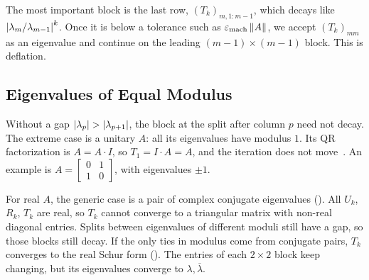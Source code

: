 The most important block is the last row, $(T_k)_{m,1:m-1}$, which decays like $\left\lvert \lambda_m/\lambda_{m-1} \right\rvert^k$. Once it is below a tolerance such as $\varepsilon_{\mathrm{mach}}\left\lVert A \right\rVert$, we accept $(T_k)_{mm}$ as an eigenvalue and continue on the leading $(m-1) \times (m-1)$ block. This is deflation.

\subsection{Eigenvalues of Equal Modulus}

Without a gap $\left\lvert \lambda_p \right\rvert > \left\lvert \lambda_{p+1} \right\rvert$, the block at the split after column $p$ need not decay. The extreme case is a unitary $A$: all its eigenvalues have modulus $1$. Its QR factorization is $A = A \cdot I$, so $T_1 = I \cdot A = A$, and the iteration does not move~\cite[Example~4.6]{Demmel}. An example is $A = \left[\begin{smallmatrix} 0 & 1 \\ 1 & 0 \end{smallmatrix}\right]$, with eigenvalues $\pm 1$.

For real $A$, the generic case is a pair of complex conjugate eigenvalues (). All $U_k$, $R_k$, $T_k$ are real, so $T_k$ cannot converge to a triangular matrix with non-real diagonal entries. Splits between eigenvalues of different moduli still have a gap, so those blocks still decay. If the only ties in modulus come from conjugate pairs, $T_k$ converges to the real Schur form (). The entries of each $2 \times 2$ block keep changing, but its eigenvalues converge to $\lambda, \overline{\lambda}$.
